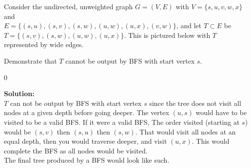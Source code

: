 \documentclass[9pt]{article}
\def\solutions{0}
\begin{document}

\vspace{5mm}

\item

Consider the undirected, unweighted graph $G=(V,E)$ with $V=\{s,u,v,w,x\}$ and
\\$E=\{(s, u), (s, v), (s, w), (u, w), (u, x), (v, w)\}$, and let $T\subset E$ be $T=\{(s, v), (s, w), (u, w), (u, x)\}$. This is pictured below with $T$ represented by wide edges.
\begin{center}
\end{center}
Demonstrate that $T$ cannot be output by BFS with start vertex $s$.


\if\solutions0
\vspace{2mm}

\textbf{Solution:} \\
    $T$ can not be output by BFS with start vertex $s$ since the tree does not visit all nodes at a given depth before going deeper. The vertex $(u,s)$ would have to be visited to be a valid BFS.
    If it were a valid BFS, The order visited (starting at $s$) would be $(s,v)$ then $(s,u)$ then $(s,w)$. That would visit all nodes at an equal depth, then you would traverse deeper, and visit $(u,x)$. This would complete the BFS as all nodes would be visited.
    \\The final tree produced by a BFS would look like such.
\end{document}
